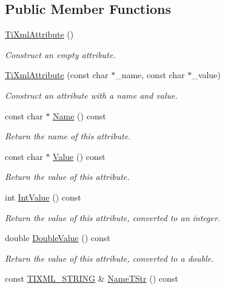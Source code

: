 \subsection*{Public Member Functions}
\begin{DoxyCompactItemize}
\item 
\hyperlink{class_ti_xml_attribute_a9cfa3c8179873fd485d83003b114f8e1}{Ti\+Xml\+Attribute} ()
\begin{DoxyCompactList}\small\item\em Construct an empty attribute. \end{DoxyCompactList}\item 
\hyperlink{class_ti_xml_attribute_a759d0b76fb8fcf765ecab243bc14f05e}{Ti\+Xml\+Attribute} (const char $\ast$\+\_\+name, const char $\ast$\+\_\+value)
\begin{DoxyCompactList}\small\item\em Construct an attribute with a name and value. \end{DoxyCompactList}\item 
const char $\ast$ \hyperlink{class_ti_xml_attribute_a298a57287d305904ba6bd96ae6f78d3d}{Name} () const 
\begin{DoxyCompactList}\small\item\em Return the name of this attribute. \end{DoxyCompactList}\item 
const char $\ast$ \hyperlink{class_ti_xml_attribute_a0f874490eac8ca00ee0070765d0e97e3}{Value} () const 
\begin{DoxyCompactList}\small\item\em Return the value of this attribute. \end{DoxyCompactList}\item 
int \hyperlink{class_ti_xml_attribute_aa1a20ad59dc7e89a0ab265396360d50f}{Int\+Value} () const 
\begin{DoxyCompactList}\small\item\em Return the value of this attribute, converted to an integer. \end{DoxyCompactList}\item 
double \hyperlink{class_ti_xml_attribute_a2880ddef53fc7522c99535273954d230}{Double\+Value} () const 
\begin{DoxyCompactList}\small\item\em Return the value of this attribute, converted to a double. \end{DoxyCompactList}\item 
const \hyperlink{tinyxml_8h_a92bada05fd84d9a0c9a5bbe53de26887}{T\+I\+X\+M\+L\+\_\+\+S\+T\+R\+I\+NG} \& \hyperlink{class_ti_xml_attribute_a64cee17bceb8232eb0736d26dd082d79}{Name\+T\+Str} () const 

\end{DoxyCompactItemize}
